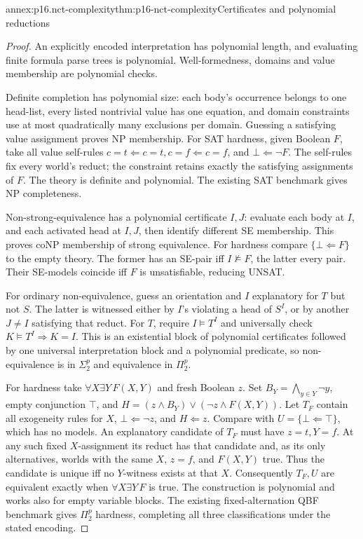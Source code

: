 \begin{annexitem}{annex:p16.nct-complexity}{thm:p16-nct-complexity}{Certificates and polynomial reductions}
\begin{proof}
An explicitly encoded interpretation has polynomial length, and evaluating
finite formula parse trees is polynomial. Well-formedness, domains and
value membership are polynomial checks.

Definite completion has polynomial size: each body's occurrence belongs
to one head-list, every listed nontrivial value has one equation, and
domain constraints use at most quadratically many exclusions per domain.
Guessing a satisfying value assignment proves NP membership.
For SAT hardness, given Boolean \(F\), take all value self-rules
\(c=t\Leftarrow c=t,c=f\Leftarrow c=f\), and
\(\bot\Leftarrow\neg F\). The self-rules fix every world's reduct;
the constraint retains exactly the satisfying assignments of \(F\).
The theory is definite and polynomial. The existing SAT benchmark gives
NP completeness.

Non-strong-equivalence has a polynomial certificate \(I,J\): evaluate
each body at \(I\), and each activated head at \(I,J\), then identify
different SE membership. This proves coNP membership of strong equivalence.
For hardness compare \(\{\bot\Leftarrow F\}\) to the empty theory.
The former has an SE-pair iff \(I\not\models F\), the latter every pair.
Their SE-models coincide iff \(F\) is unsatisfiable, reducing UNSAT.

For ordinary non-equivalence, guess an orientation and \(I\) explanatory
for \(T\) but not \(S\). The latter is witnessed either by \(I\)'s violating
a head of \(S^I\), or by another \(J\ne I\) satisfying that reduct.
For \(T\), require \(I\models T^I\) and universally check
\(K\models T^I\Rightarrow K=I\).
This is an existential block of polynomial certificates followed by one
universal interpretation block and a polynomial predicate, so
non-equivalence is in \(\Sigma_2^p\) and equivalence in \(\Pi_2^p\).

For hardness take \(\forall X\exists Y\,F(X,Y)\) and fresh Boolean \(z\).
Set \(B_Y=\bigwedge_{y\in Y}\neg y\), empty conjunction \(\top\), and
\(H=(z\land B_Y)\lor(\neg z\land F(X,Y))\).
Let \(T_F\) contain all exogeneity rules for \(X\),
\(\bot\Leftarrow\neg z\), and \(H\Leftarrow z\).
Compare with \(U=\{\bot\Leftarrow\top\}\), which has no models.
An explanatory candidate of \(T_F\) must have \(z=t,Y=f\).
At any such fixed \(X\)-assignment its reduct has that candidate and,
as its only alternatives, worlds with the same \(X\), \(z=f\), and
\(F(X,Y)\) true. Thus the candidate is unique iff no \(Y\)-witness
exists at that \(X\). Consequently \(T_F,U\) are equivalent exactly
when \(\forall X\exists Y\,F\) is true.
The construction is polynomial and works also for empty variable blocks.
The existing fixed-alternation QBF benchmark gives \(\Pi_2^p\) hardness,
completing all three classifications under the stated encoding.
\end{proof}
\end{annexitem}

